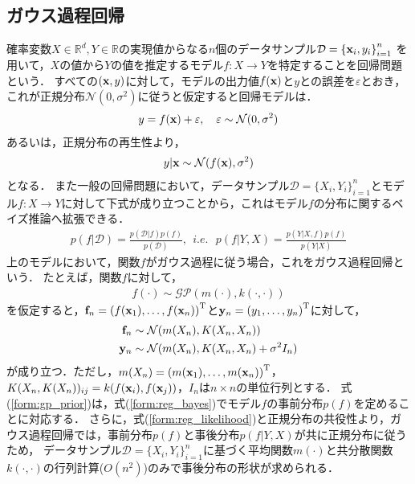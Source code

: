 \documentclass[11pt,a4j]{article}
\begin{document}
    \subsection{ガウス過程回帰}
      確率変数$X \in \mathbb{R}^{d}, Y \in \mathbb{R}$の実現値からなる$n$個のデータサンプル$\mathcal{D} = {\{ {\bf x}_i, y_i \}}_{i=1}^n$
      を用いて，$X$の値から$Y$の値を推定するモデル$f:X \to Y$を特定することを回帰問題という．
      すべての$({\bf x}, y)$に対して，モデルの出力値$f({\bf x})$と$y$との誤差を$\varepsilon$とおき，これが正規分布$\mathcal{N}(0, \sigma^2)$に従うと仮定すると回帰モデルは．
      \begin{align}
        y = f({\bf x}) + \varepsilon, ~~~ \varepsilon \sim \mathcal{N}(0, \sigma^2)
      \end{align}
      あるいは，正規分布の再生性より，
      \begin{align}
        y | {\bf x} \sim \mathcal{N}(f({\bf x}), \sigma^2) \label{form:reg_likelihood}
      \end{align}
      となる．
      また一般の回帰問題において，データサンプル$\mathcal{D} = {\{ X_i, Y_i \}}_{i=1}^n$とモデル$f:X \to Y$に対して下式が成り立つことから，これはモデル$f$の分布に関するベイズ推論へ拡張できる．
      \begin{align}
        p(f|\mathcal{D}) = \frac{p(\mathcal{D}|f)p(f)}{p(\mathcal{D})}, ~~i.e.~~~
        p(f | Y,X) = \frac{ p( Y | X, f) p(f) }{p( Y | X )} \label{form:reg_bayes}
      \end{align}
      上のモデルにおいて，関数$f$がガウス過程に従う場合，これをガウス過程回帰という．
      たとえば，関数$f$に対して，
      \begin{align}
        f(\cdot) \sim \mathcal{GP}(m(\cdot), k(\cdot,\cdot)) \label{form:gp_prior}
      \end{align}
      を仮定すると，${\bf f}_n = { ( f({\bf x}_1),\dots,f({\bf x}_n) ) }^{\mathrm{T}}$と${\bf y}_n = {( y_1,\dots,y_n )}^{\mathrm{T}}$に対して，
      \begin{align}
        {\bf f}_n &\sim \mathcal{N}(m(X_n), K(X_n,X_n)) \\
        {\bf y}_n &\sim \mathcal{N}(m(X_n), K(X_n,X_n) + \sigma^2 I_n)
      \end{align}
      が成り立つ．ただし，$ m(X_n) = { ( m({\bf x}_1), \dots, m({\bf x}_n) ) }^{\mathrm{T}} $，
      $K(X_n,K(X_n))_{ij} = k(f({\bf x}_i), f({\bf x}_j))$，$I_n$は$n \times n$の単位行列とする．
      式(\ref{form:gp_prior})は，式(\ref{form:reg_bayes})でモデル$f$の事前分布$p(f)$を定めることに対応する．
      さらに，式(\ref{form:reg_likelihood})と正規分布の共役性より，ガウス過程回帰では，事前分布$p(f)$と事後分布$p(f|Y,X)$が共に正規分布に従うため，
      データサンプル$\mathcal{D} = {\{ X_i, Y_i \}}_{i=1}^n$に基づく平均関数$m(\cdot)$と共分散関数$k(\cdot,\cdot)$の行列計算($O(n^2)$)のみで事後分布の形状が求められる．
      
\end{document}
